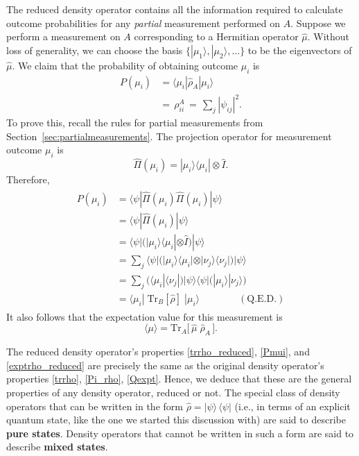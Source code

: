 \documentclass[pra,12pt]{revtex4}
\begin{document}
The reduced density operator contains all the information required to
calculate outcome probabilities for any \textit{partial} measurement
performed on $A$.  Suppose we perform a measurement on $A$
corresponding to a Hermitian operator $\hat{\mu}$.  Without loss of
generality, we can choose the basis
$\{|\mu_1\rangle,|\mu_2\rangle,\dots\}$ to be the eigenvectors of
$\hat{\mu}$.  We claim that the probability of obtaining outcome
$\mu_i$ is
\begin{align}
  P(\mu_i) &= \langle \mu_i | \hat{\rho}_A |\mu_i \rangle \label{Pmui} \\
  &=\, \rho_{ii}^A \,=\, \sum_{j} |\psi_{ij}|^2.
\end{align}
To prove this, recall the rules for partial measurements from
Section~\ref{sec:partialmeasurements}.  The projection operator for
measurement outcome $\mu_i$ is
\begin{equation}
  \hat{\Pi}(\mu_i) = |\mu_i\rangle\langle \mu_i| \otimes \hat{I}.
\end{equation}
Therefore,
\begin{align}
  \begin{aligned}
    P(\mu_i) &= \langle \psi | \hat{\Pi}(\mu_i) \hat{\Pi}(\mu_i) |\psi\rangle \\
    &= \langle \psi | \hat{\Pi}(\mu_i) |\psi\rangle \\
    &= \langle \psi | \Big(|\mu_i\rangle\langle \mu_i| \otimes \hat{I}\Big)
    |\psi\rangle \\
    &= \sum_j \langle \psi | \Big(|\mu_i\rangle\langle \mu_i| \otimes
    |\nu_j\rangle\langle \nu_j|\Big) |\psi\rangle \\
    &= \sum_j \Big(\langle\mu_i|\langle\nu_j|\Big) |\psi\rangle\langle\psi|
    \Big(|\mu_i\rangle |\nu_j\rangle\Big) \\
    &= \langle \mu_i| \;\mathrm{Tr}_B[ \hat{\rho}]\; |\mu_i\rangle \qquad\qquad
    (\textrm{Q.E.D.})
  \end{aligned}
\end{align}
It also follows that the expectation value for this measurement is
\begin{equation}
  \langle \mu \rangle =
  \mathrm{Tr}_A \big[\, \hat{\mu} \; \hat{\rho}_A\,\big].
  \label{exptrho_reduced}
\end{equation}

The reduced density operator's properties \eqref{trrho_reduced},
\eqref{Pmui}, and \eqref{exptrho_reduced} are precisely the same as
the original density operator's properties \eqref{trrho},
\eqref{Pi_rho}, \eqref{Qexpt}.  Hence, we deduce that these are the
general properties of any density operator, reduced or not.  The
special class of density operators that can be written in the form
$\hat{\rho} = |\psi\rangle\, \langle\psi|$ (i.e., in terms of an
explicit quantum state, like the one we started this discussion with)
are said to describe \textbf{pure states}.  Density operators that
cannot be written in such a form are said to describe \textbf{mixed
  states}.
\end{document}
